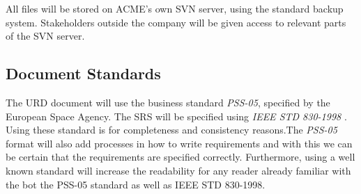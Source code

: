 \documentclass[a4paper]{article}
\begin{document}
All files will be stored on ACME's own SVN server, using the standard backup system. Stakeholders outside the company will be given access to relevant parts of the SVN server.
 
\subsection{Document Standards}
\label{sub:document_standards}
The URD document will use the business standard \emph{PSS-05}, specified by the European Space Agency\cite{PSS}. The SRS will be specified using \emph{IEEE STD 830-1998} \cite{IEEE}. Using these standard is for completeness and consistency reasons.The \emph{PSS-05} format will also add processes in how to write requirements and with this we can be certain that the requirements are specified correctly. Furthermore, using a well known standard will increase the readability for any reader already familiar with the bot the PSS-05 standard as well as IEEE STD 830-1998.
\end{document}
